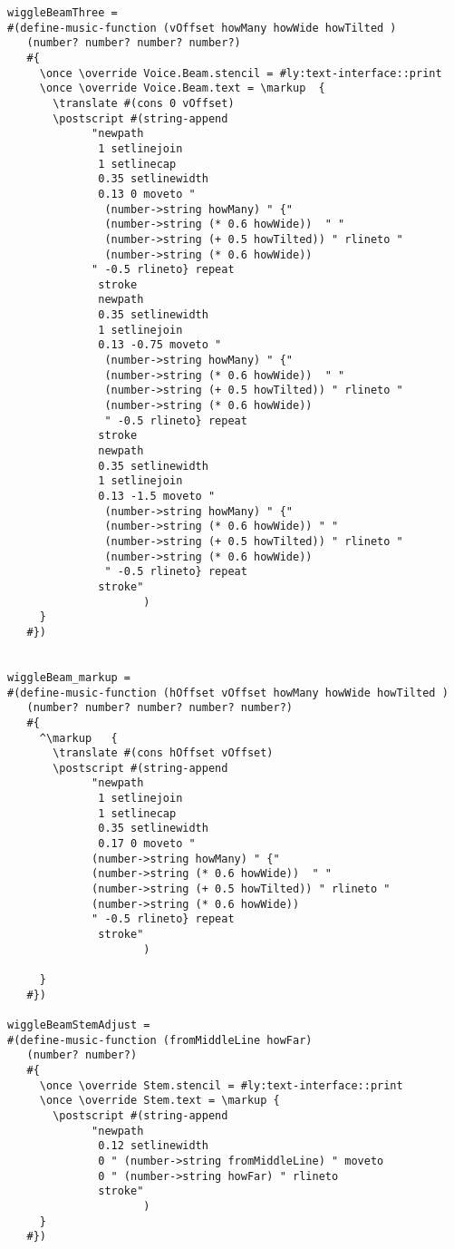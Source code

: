 \begin{verbatim}
wiggleBeamThree =
#(define-music-function (vOffset howMany howWide howTilted )
   (number? number? number? number?)
   #{
     \once \override Voice.Beam.stencil = #ly:text-interface::print
     \once \override Voice.Beam.text = \markup 	{
       \translate #(cons 0 vOffset)
       \postscript #(string-append
             "newpath 
              1 setlinejoin 
              1 setlinecap 
              0.35 setlinewidth 
              0.13 0 moveto "
               (number->string howMany) " {"
               (number->string (* 0.6 howWide))  " "
               (number->string (+ 0.5 howTilted)) " rlineto "
               (number->string (* 0.6 howWide))
             " -0.5 rlineto} repeat 
              stroke 
              newpath 
              0.35 setlinewidth 
              1 setlinejoin 
              0.13 -0.75 moveto "
               (number->string howMany) " {"
               (number->string (* 0.6 howWide))  " "
               (number->string (+ 0.5 howTilted)) " rlineto "
               (number->string (* 0.6 howWide))
               " -0.5 rlineto} repeat 
              stroke 
              newpath 
              0.35 setlinewidth 
              1 setlinejoin 
              0.13 -1.5 moveto "
               (number->string howMany) " {"
               (number->string (* 0.6 howWide)) " "
               (number->string (+ 0.5 howTilted)) " rlineto "
               (number->string (* 0.6 howWide))
               " -0.5 rlineto} repeat 
              stroke"
                     )
     }
   #})


wiggleBeam_markup =
#(define-music-function (hOffset vOffset howMany howWide howTilted )
   (number? number? number? number? number?)
   #{
     ^\markup 	{
       \translate #(cons hOffset vOffset)
       \postscript #(string-append
             "newpath 
              1 setlinejoin 
              1 setlinecap 
              0.35 setlinewidth 
              0.17 0 moveto "
             (number->string howMany) " {"
             (number->string (* 0.6 howWide))  " "
             (number->string (+ 0.5 howTilted)) " rlineto "
             (number->string (* 0.6 howWide))
             " -0.5 rlineto} repeat 
              stroke"
                     )

     }
   #})

wiggleBeamStemAdjust =
#(define-music-function (fromMiddleLine howFar)
   (number? number?)
   #{
     \once \override Stem.stencil = #ly:text-interface::print
     \once \override Stem.text = \markup {
       \postscript #(string-append
             "newpath 
              0.12 setlinewidth 
              0 " (number->string fromMiddleLine) " moveto 
              0 " (number->string howFar) " rlineto 
              stroke"
                     )
     }
   #})
   

\end{verbatim}
